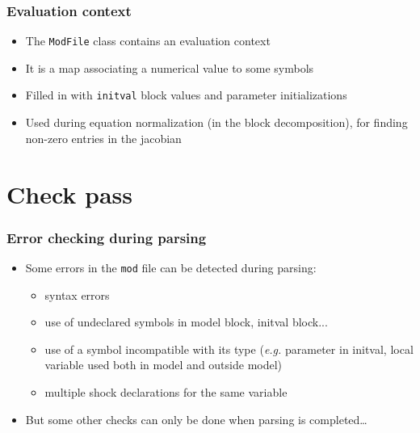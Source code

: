 \documentclass{beamer}
\begin{document}
\begin{frame}
  \frametitle{Evaluation context}
  \begin{itemize}
  \item The \texttt{ModFile} class contains an \alert{evaluation context}
  \item It is a map associating a numerical value to some symbols
  \item Filled in with \texttt{initval} block values and parameter initializations
  \item Used during equation normalization (in the block decomposition), for finding non-zero entries in the jacobian
  \end{itemize}
\end{frame}

\section{Check pass}

\begin{frame}
  \frametitle{Error checking during parsing}
  \begin{itemize}
  \item Some errors in the \texttt{mod} file can be detected during parsing:
    \begin{itemize}
    \item syntax errors
    \item use of undeclared symbols in model block, initval block...
    \item use of a symbol incompatible with its type (\textit{e.g.} parameter in initval, local variable used both in model and outside model)
    \item multiple shock declarations for the same variable
    \end{itemize}
  \item But some other checks can only be done when parsing is completed\ldots
  \end{itemize}
\end{frame}
\end{document}
